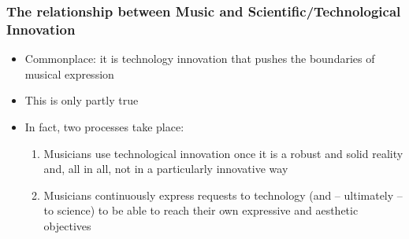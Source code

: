 \begin{frame}
    \frametitle<+- | alert@+->{The relationship between Music and Scientific/Technological Innovation}

    \begin{itemize}[<+- | alert@+->]
        \item Commonplace: it is technology innovation that
								pushes the boundaries of musical expression
        \item This is only partly true
        \item In fact, two processes take place:
            \begin{enumerate}[<+- | alert@+->]
								\item Musicians use technological innovation once
												it is a robust and solid reality and, all in all,
												not in a particularly innovative way
								\item Musicians continuously express requests to technology
												(and -- ultimately -- to science) to be able
												to reach their own expressive and aesthetic objectives
            \end{enumerate}
    \end{itemize}

\end{frame}

